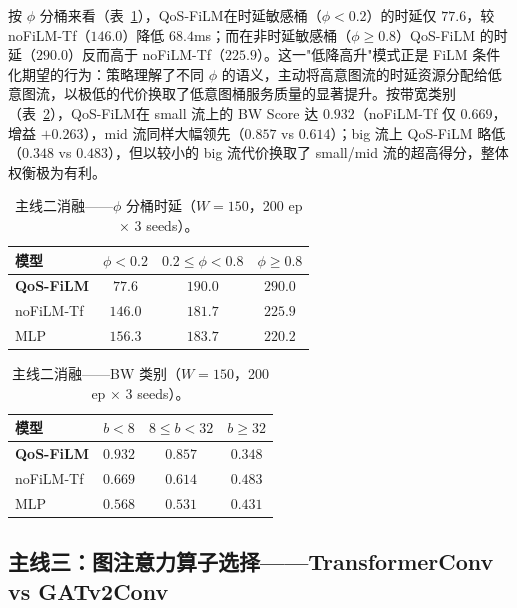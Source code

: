 按 $\phi$ 分桶来看（表~\ref{tab:film_w150_phi}），QoS-FiLM在时延敏感桶（$\phi<0.2$）的时延仅 $77.6$，较 noFiLM-Tf（$146.0$）降低 $68.4$ms；而在非时延敏感桶（$\phi\geq 0.8$）QoS-FiLM 的时延（$290.0$）反而高于 noFiLM-Tf（$225.9$）。这一"低降高升"模式正是 FiLM 条件化期望的行为：策略理解了不同 $\phi$ 的语义，主动将高意图流的时延资源分配给低意图流，以极低的代价换取了低意图桶服务质量的显著提升。按带宽类别（表~\ref{tab:film_w150_bw}），QoS-FiLM在 small 流上的 BW Score 达 $0.932$（noFiLM-Tf 仅 $0.669$，增益 $+0.263$），mid 流同样大幅领先（$0.857$ vs $0.614$）；big 流上 QoS-FiLM 略低（$0.348$ vs $0.483$），但以较小的 big 流代价换取了 small/mid 流的超高得分，整体权衡极为有利。

\begin{table}[t]
\centering
\caption{主线二消融——$\phi$ 分桶时延（$W\!=\!150$，200 ep × 3 seeds）\protect\footnotemark[1]。}
\label{tab:film_w150_phi}
\setlength{\tabcolsep}{3pt}
\begin{tabular}{lccc}
\toprule
模型 & $\phi<0.2$ & $0.2\!\le\!\phi\!<\!0.8$ & $\phi\!\ge\!0.8$ \\
\midrule
\textbf{QoS-FiLM} & $\mathbf{77.6}$ & $190.0$ & $290.0$ \\
noFiLM-Tf        & $146.0$ & $181.7$ & $225.9$ \\
MLP              & $156.3$ & $183.7$ & $220.2$ \\
\bottomrule
\end{tabular}
\end{table}

\begin{table}[t]
\centering
\caption{主线二消融——BW 类别（$W\!=\!150$，200 ep × 3 seeds）\protect\footnotemark[1]。}
\label{tab:film_w150_bw}
\setlength{\tabcolsep}{3pt}
\begin{tabular}{lccc}
\toprule
模型 & $b<8$ & $8\!\le\!b\!<\!32$ & $b\!\ge\!32$ \\
\midrule
\textbf{QoS-FiLM} & $\mathbf{0.932}$ & $\mathbf{0.857}$ & $0.348$ \\
noFiLM-Tf        & $0.669$ & $0.614$ & $0.483$ \\
MLP              & $0.568$ & $0.531$ & $0.431$ \\
\bottomrule
\end{tabular}
\end{table}

\subsection{主线三：图注意力算子选择——TransformerConv vs GATv2Conv}
\label{sec:exp:conv}


